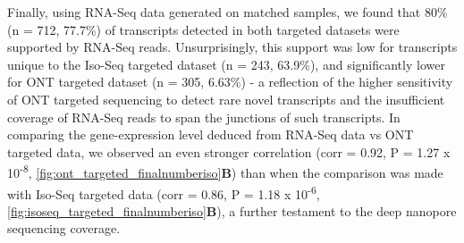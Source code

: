 Finally, using RNA-Seq data generated on matched samples, we found that 80\% (n = 712, 77.7\%) of transcripts detected in both targeted datasets were supported by RNA-Seq reads. Unsurprisingly, this support was low for transcripts unique to the Iso-Seq targeted dataset (n = 243, 63.9\%), and significantly lower for ONT targeted dataset (n = 305, 6.63\%) - a reflection of the higher sensitivity of ONT targeted sequencing to detect rare novel transcripts and the insufficient coverage of RNA-Seq reads to span the junctions of such transcripts. In comparing the gene-expression level deduced from RNA-Seq data vs ONT targeted data, we observed an even stronger correlation (corr = 0.92, P = 1.27 x 10\textsuperscript{-8}, \cref{fig:ont_targeted_finalnumberiso}\textbf{B}) than when the comparison was made with Iso-Seq targeted data (corr = 0.86, P = 1.18 x 10\textsuperscript{-6}, \cref{fig:isoseq_targeted_finalnumberiso}\textbf{B}), a further testament to the deep nanopore sequencing coverage.  


